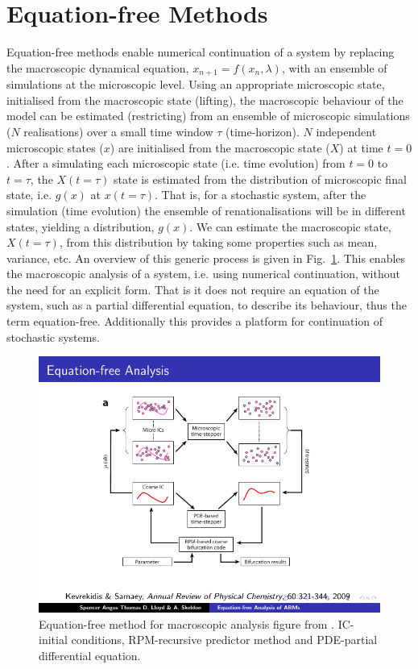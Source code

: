 \documentclass[11pt]{article}
\begin{document}
\section{Equation-free Methods} 
\label{sec:EF}
Equation-free methods \cite{Theodoropoulos2000, Kevrekidis2003} enable numerical continuation of a system by replacing the macroscopic dynamical equation, $x_{n+1} =f(x_n,\lambda)$, with an ensemble of simulations at the microscopic level. Using an appropriate microscopic state, initialised from the macroscopic state (lifting), the macroscopic behaviour of the model can be estimated (restricting) from an ensemble of microscopic simulations ($N$ realisations) over a small time window $\tau$ (time-horizon). $N$ independent microscopic states ($x$) are initialised from the macroscopic state ($X$) at time $t=0$. After a simulating each microscopic state (i.e. time evolution) from $t=0$ to $t=\tau$, the $X(t=\tau)$ state is estimated from the distribution of microscopic final state, i.e. $g(x)$ at $x(t=\tau)$. That is, for a stochastic system, after the simulation (time evolution) the ensemble of renationalisations will be in different states, yielding a distribution, $g(x)$. We can estimate the macroscopic state, $X(t=\tau)$, from this distribution by taking some properties such as mean, variance, etc. An overview of this generic process is given in Fig.~\ref{fig:EF}. This enables the macroscopic analysis of a system, i.e. using numerical continuation, without the need for an explicit form. That is it does not require an equation of the system, such as a partial differential equation, to describe its behaviour, thus the term equation-free. Additionally this provides a platform for continuation of stochastic systems.

\begin{figure}[h]
	\centering
	\includegraphics[width=\textwidth, trim= 1cm 1cm 1cm 1cm, clip=true]{EquationFreeOriginal}
	\caption{Equation-free method for macroscopic analysis figure from \cite{Kevrekidis2009}. IC-initial conditions, RPM-recursive predictor method and PDE-partial differential equation. \label{fig:EF}}
\end{figure}
\end{document}
